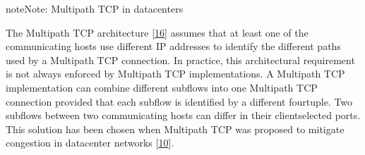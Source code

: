 \documentclass[letterpaper,10pt,english]{sphinxmanual}
\begin{document}
\begin{sphinxadmonition}{note}{Note:}
\sphinxAtStartPar
Multipath TCP in datacenters

\sphinxAtStartPar
The Multipath TCP architecture {[}\hyperlink{cite.biblio:id6033}{16}{]} assumes that at least one of the communicating hosts use different IP addresses to identify the different paths used by a Multipath TCP connection. In practice, this architectural requirement is not always enforced by Multipath TCP implementations. A Multipath TCP implementation can combine different subflows into one Multipath TCP connection provided that each subflow is identified by a different four\sphinxhyphen{}tuple. Two subflows between two communicating hosts can differ in their client\sphinxhyphen{}selected ports. This solution has been chosen when Multipath TCP was proposed to mitigate congestion in datacenter networks {[}\hyperlink{cite.biblio:id8933}{10}{]}.


\end{sphinxadmonition}
\end{document}
